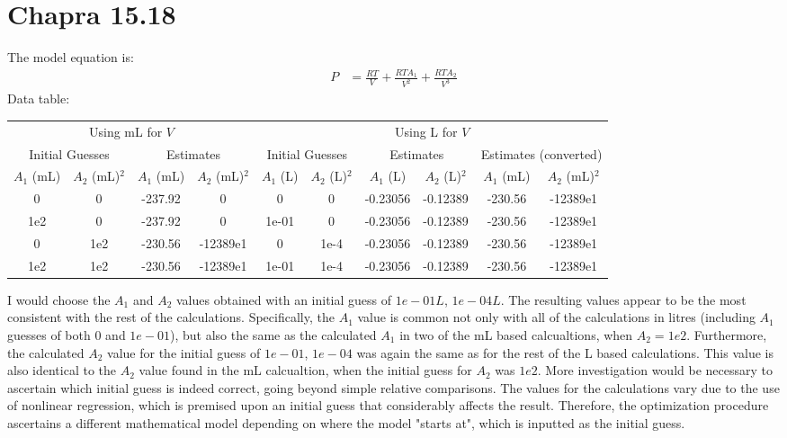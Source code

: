 \documentclass{article}
\begin{document}
\section{Chapra 15.18}
The model equation is:
\begin{align*}
P&=\frac{RT}{V} + \frac{RTA_1}{V^2} + \frac {RTA_2}{V^3}
\end{align*}
Data table:
\begin{center}
\begin{tabular}{|c|c|c|c|c|c|c|c|c|c|} \hline
\multicolumn{4}{|c|}{Using mL for $V$} & 
\multicolumn{6}{|c|}{Using L for $V$}\\
\multicolumn{2}{|c|}{Initial Guesses} & 
\multicolumn{2}{|c|}{Estimates} & 
\multicolumn{2}{|c|}{Initial Guesses} & 
\multicolumn{2}{|c|}{Estimates} & 
\multicolumn{2}{|c|}{Estimates (converted)} \\ 
$A_1$ (mL) & $A_2$ (mL)$^2$  & $A_1$ (mL)  & $A_2$ (mL)$^2$  & $A_1$ (L)  &
$A_2$ (L)$^2$ & $A_1$ (L) & $A_2$ (L)$^2$  & $A_1$ (mL) & $A_2$ (mL)$^2$  \\ \hline
0   & 0   & -237.92 & 0 & 0   & 0  & -0.23056 & -0.12389 & -230.56 & -12389e1\\
1e2 & 0   & -237.92 & 0 & 1e-01 & 0  & -0.23056 & -0.12389 & -230.56 & -12389e1 \\
0   & 1e2 & -230.56 & -12389e1 & 0   & 1e-4 & -0.23056 & -0.12389 & -230.56 & -12389e1 \\
1e2 & 1e2 & -230.56 & -12389e1 & 1e-01 & 1e-4 & -0.23056 & -0.12389 & -230.56 & -12389e1 \\ \hline
\end{tabular}
\end{center}
I would choose the $A_1$ and $A_2$ values obtained with an initial guess of $1e-01 L$, $1e-04 L$. The resulting values appear to be the most consistent with the rest of the calculations. Specifically, the $A_1$ value is common not only with all of the calculations in litres (including $A_1$ guesses of both $0$ and $1e-01$), but also the same as the calculated $A_1$ in two of the mL based calcualtions, when $A_2 = 1e2$. Furthermore, the calculated $A_2$ value for the initial guess of $1e-01$, $1e-04$ was again the same as for the rest of the L based calculations. This value is also identical to the $A_2$ value found in the mL calcualtion, when the initial guess for $A_2$ was $1e2$. More investigation would be necessary to ascertain which initial guess is indeed correct, going beyond simple relative comparisons. The values for the calculations vary due to the use of nonlinear regression, which is premised upon an initial guess that considerably affects the result. Therefore, the optimization procedure ascertains a different mathematical model depending on where the model "starts at", which is inputted as the initial guess.
\end{document}
